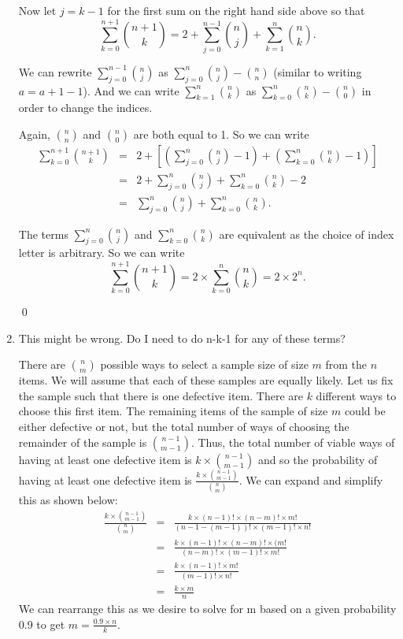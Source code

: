 \documentclass[letterpaper,12pt]{article}
\begin{document}
\begin{enumerate}
Now let $j = k-1$ for the first sum on the right hand side above so that 
\[ \sum_{k=0}^{n+1}{n+1 \choose k} = 2 +  \sum_{j=0}^{n-1}{n \choose j} + \sum_{k=1}^n{n \choose k}. \]

We can rewrite $\sum_{j=0}^{n-1}{n \choose j}$ as $\sum_{j=0}^{n}{n \choose j} - {n \choose n}$ (similar to writing $a = a + 1 - 1$). And we can write $\sum_{k=1}^n{n \choose k}$ as $\sum_{k=0}^n{n \choose k} - {n \choose 0}$ in order to change the indices.

Again, ${n \choose n}$ and ${n \choose 0}$ are both equal to 1. So we can write 
\begin{eqnarray*}
\sum_{k=0}^{n+1}{n+1 \choose k} & = & 2 +  \left[ \left( \sum_{j=0}^{n}{n \choose j} - 1 \right) + \left( \sum_{k=0}^n{n \choose k} - 1 \right) \right] \\
					      & = & 2 +  \sum_{j=0}^{n}{n \choose j} + \sum_{k=0}^n{n \choose k} - 2 \\
					      & = &  \sum_{j=0}^{n}{n \choose j} + \sum_{k=0}^n{n \choose k}.
\end{eqnarray*}

The terms $\sum_{j=0}^{n}{n \choose j}$ and $\sum_{k=0}^n{n \choose k}$ are equivalent as the choice of index letter is arbitrary. So we can write
\[ \sum_{k=0}^{n+1}{n+1 \choose k} = 2 \times \sum_{k=0}^n{n \choose k} = 2 \times 2^n. \]
\begin{flushright} \qed \end{flushright}


\item
This might be wrong. Do I need to do n-k-1 for any of these terms?

There are ${n \choose m}$ possible ways to select a sample size of size $m$ from the $n$ items. We will assume that each of these samples are equally likely. Let us fix the sample such that there is one defective item. There are $k$ different ways to choose this first item. The remaining items of the sample of size $m$ could be either defective or not, but the total number of ways of choosing the remainder of the sample is ${n-1 \choose m-1}$. Thus, the total number of viable ways of having at least one defective item is $k \times {n-1 \choose m-1}$ and so the probability of having at least one defective item is $\frac{k \times {n-1 \choose m-1}}{{n \choose m}}.$ We can expand and simplify this as shown below:
\begin{eqnarray*}
\frac{k \times {n-1 \choose m-1}}{{n \choose m}} & = & \frac{k \times (n-1)! \times (n-m)! \times m!}{(n-1-(m-1))! \times (m-1)! \times n!} \\
							      & = & \frac{k \times (n-1)! \times (n-m)! \times (m!}{(n-m)! \times (m-1)! \times m!} \\
							      & = & \frac{k \times (n-1)! \times m!}{(m-1)! \times n!} \\
							      & = & \frac{k \times m}{n} 
\end{eqnarray*}
We can rearrange this as we desire to solve for m based on a given probability 0.9 to get $m = \frac{0.9 \times n}{k}.$


\end{enumerate}
\end{document}
